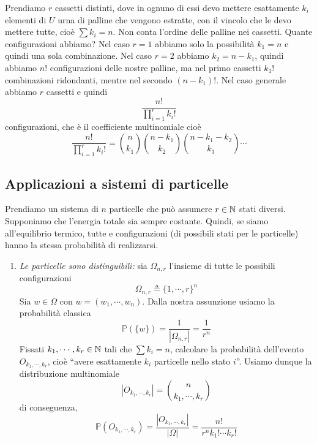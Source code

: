 \documentclass[a4paper]{article}
\begin{document}
\begin{snippetexercise}{}
    Prendiamo \(r\) cassetti distinti,
    dove in ognuno di essi devo mettere esattamente
    \(k_i\) elementi di \(U\) urna di palline che vengono estratte,
    con il vincolo che le devo mettere tutte, cioè
    \(\sum k_i = n\). Non conta l'ordine delle palline nei cassetti.
    Quante configurazioni abbiamo?
    Nel caso \(r=1\) abbiamo solo la possibilità \(k_1 = n\) e quindi una sola combinazione.
    Nel caso \(r=2\) abbiamo \(k_2 = n-k_1\),
    quindi abbiamo \(n!\) configurazioni delle nostre palline,
    ma nel primo cassetti \(k_1!\) combinazioni ridondanti, mentre nel secondo \((n-k_1)!\).
    Nel caso generale abbiamo \(r\) cassetti e quindi \[
        \frac{n!}{\prod_{i=1}^r k_i!}
    \]
    configurazioni, che è il coefficiente multinomiale cioè
    \[
        \frac{n!}{\prod_{i=1}^r k_i!} =
        \binom{n}{k_1}
        \binom{n-k_1}{k_2}
        \binom{n-k_1-k_2}{k_3} \cdots
    \]
\end{snippetexercise}

\subsection{Applicazioni a sistemi di particelle}

Prendiamo un sistema di \(n\)
particelle che può assumere \(r \in \mathbb{N}\)
stati diversi.
Supponiamo che l'energia totale sia sempre costante.
Quindi, se siamo all'equilibrio termico, tutte e configurazioni
(di possibili stati per le particelle) hanno la stessa probabilità
di realizzarsi.
\begin{enumerate}
    \item \emph{Le particelle sono distinguibili:}
        sia \(\Omega_{n,r}\) l'insieme di tutte le possibili configurazioni
        \[
            \Omega_{n,r} \triangleq
            \{1, \cdots, r\}^n
        \]
        Sia \(w \in \Omega\) con \(w = (w_1, \cdots, w_n)\).
        Dalla nostra assunzione usiamo la probabilità classica
        \[
            \mathbb P(\{w\}) = \frac{1}{|\Omega_{n,r}|} = \frac{1}{r^n}
        \]
        Fissati \(k_1, \cdots, k_r \in \mathbb{N}\)
        tali che \(\sum k_i = n\), calcolare
        la probabilità dell'evento
        \(O_{k_1, \cdots, k_r}\), cioè ``avere esattamente \(k_i\) particelle nello stato \(i\)''.
        Usiamo dunque la distribuzione multinomiale
        \[
            |O_{k_1, \cdots, k_r}| = \binom{n}{k_1, \cdots, k_r}
        \]
        di conseguenza,
        \[
            \mathbb P(O_{k_1, \cdots, k_r})
            = \frac{|O_{k_1, \cdots, k_r}|}{|\Omega|} = \frac{n!}{r^n k_1! \cdots k_r!}
        \]
\end{enumerate}
\end{document}
